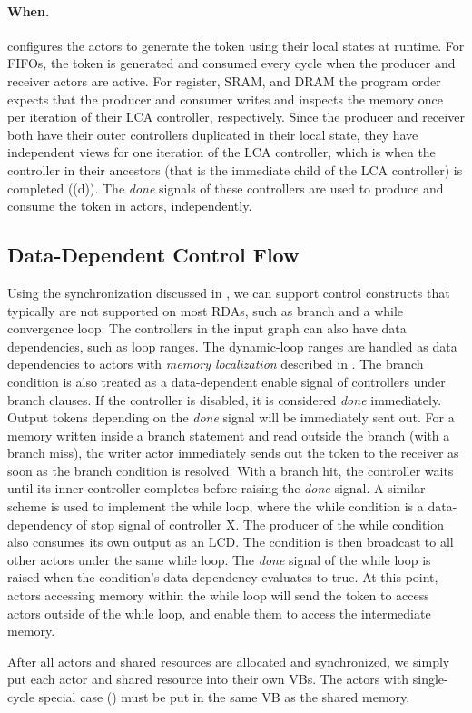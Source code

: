 \paragraph{When.}
\name{} configures the actors to generate the token using their local states at runtime.
For FIFOs, the token is generated and consumed every cycle when the producer and receiver actors are active.
For register, SRAM, and DRAM the program order expects that the producer and consumer writes and inspects the memory once per iteration of their LCA controller, respectively.
Since the producer and receiver both have their outer controllers duplicated in their local state, they have independent views for one iteration of the LCA controller, which is when the controller in their ancestors (that is the immediate child of the LCA controller) is completed ((d)).
The {\em done} signals of these controllers are used to produce and consume the token in actors, independently.

\subsection{Data-Dependent Control Flow}
Using the synchronization discussed in , we can support control constructs that typically are not supported on most RDAs, such as branch and a while convergence loop.
The controllers in the input graph can also have data dependencies, such as loop ranges. 
The dynamic-loop ranges are handled as data dependencies to actors with \emph{memory localization} described in .
The branch condition is also treated as a data-dependent enable signal of controllers under branch clauses.
If the controller is disabled, it is considered {\em done} immediately.
Output tokens depending on the {\em done} signal will be immediately sent out.
For a memory written inside a branch statement and read outside the branch (with a branch miss), the writer actor immediately sends out the token to the receiver
as soon as the branch condition is resolved. 
With a branch hit, the controller waits until its inner controller completes before raising the {\em done} signal.
A similar scheme is used to implement the while loop, where the while condition is a data-dependency of stop signal of controller X. 
The producer of the while condition also consumes its own output as an LCD. 
The condition is then broadcast to all other actors under the same while loop. 
The {\em done} signal of the while loop is raised when the condition's data-dependency evaluates to true.
At this point, actors accessing memory within the while loop will send the token to access actors outside of the while loop, and enable them to access the intermediate memory.

After all actors and shared resources are allocated and synchronized, we simply put each actor and shared resource into their own VBs.
The actors with single-cycle special case () must be put in the same VB as the shared memory.

